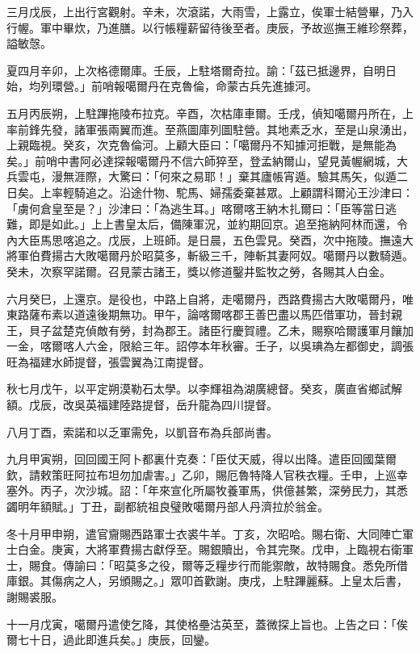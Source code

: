 \begin{pinyinscope}
三月戊辰，上出行宮觀射。辛未，次滾諾，大雨雪，上露立，俟軍士結營畢，乃入行幄。軍中畢炊，乃進膳。以行帳糧薪留待後至者。庚辰，予故巡撫王維珍祭葬，謚敏愨。

夏四月辛卯，上次格德爾庫。壬辰，上駐塔爾奇拉。諭：「茲已抵邊界，自明日始，均列環營。」前哨報噶爾丹在克魯倫，命蒙古兵先進據河。

五月丙辰朔，上駐蹕拖陵布拉克。辛酉，次枯庫車爾。壬戌，偵知噶爾丹所在，上率前鋒先發，諸軍張兩翼而進。至燕圖庫列圖駐營。其地素乏水，至是山泉湧出，上親臨視。癸亥，次克魯倫河。上顧大臣曰：「噶爾丹不知據河拒戰，是無能為矣。」前哨中書阿必達探報噶爾丹不信六師猝至，登孟納爾山，望見黃幄網城，大兵雲屯，漫無涯際，大驚曰：「何來之易耶！」棄其廬帳宵遁。驗其馬矢，似遁二日矣。上率輕騎追之。沿途什物、駝馬、婦孺委棄甚眾。上顧謂科爾沁王沙津曰：「虜何倉皇至是？」沙津曰：「為逃生耳。」喀爾喀王納木扎爾曰：「臣等當日逃難，即是如此。」上上書皇太后，備陳軍況，並約期回京。追至拖納阿林而還，令內大臣馬思喀追之。戊辰，上班師。是日晨，五色雲見。癸酉，次中拖陵。撫遠大將軍伯費揚古大敗噶爾丹於昭莫多，斬級三千，陣斬其妻阿奴。噶爾丹以數騎遁。癸未，次察罕諾爾。召見蒙古諸王，獎以修道鑿井監牧之勞，各賜其人白金。

六月癸巳，上還京。是役也，中路上自將，走噶爾丹，西路費揚古大敗噶爾丹，唯東路薩布素以道遠後期無功。甲午，論喀爾喀郡王善巴盡以馬匹借軍功，晉封親王，貝子盆楚克偵敵有勞，封為郡王。諸臣行慶賀禮。乙未，賜察哈爾護軍月饟加一金，喀爾喀人六金，限給三年。詔停本年秋審。壬子，以吳琠為左都御史，調張旺為福建水師提督，張雲翼為江南提督。

秋七月戊午，以平定朔漠勒石太學。以李輝祖為湖廣總督。癸亥，廣直省鄉試解額。戊辰，改吳英福建陸路提督，岳升龍為四川提督。

八月丁酉，索諾和以乏軍需免，以凱音布為兵部尚書。

九月甲寅朔，回回國王阿卜都裏什克奏：「臣仗天威，得以出降。遣臣回國葉爾欽，請敕策旺阿拉布坦勿加虐害。」乙卯，賜厄魯特降人官秩衣糧。壬申，上巡幸塞外。丙子，次沙城。詔：「年來宣化所屬牧養軍馬，供億甚繁，深勞民力，其悉蠲明年額賦。」丁丑，副都統祖良璧敗噶爾丹部人丹濟拉於翁金。

冬十月甲申朔，遣官齎賜西路軍士衣裘牛羊。丁亥，次昭哈。賜右衛、大同陣亡軍士白金。庚寅，大將軍費揚古獻俘至。賜銀贖出，令其完聚。戊申，上臨視右衛軍士，賜食。傳諭曰：「昭莫多之役，爾等乏糧步行而能禦敵，故特賜食。悉免所借庫銀。其傷病之人，另頒賜之。」眾叩首歡謝。庚戌，上駐蹕麗蘇。上皇太后書，謝賜裘服。

十一月戊寅，噶爾丹遣使乞降，其使格壘沽英至，蓋微探上旨也。上告之曰：「俟爾七十日，過此即進兵矣。」庚辰，回鑾。


\end{pinyinscope}
